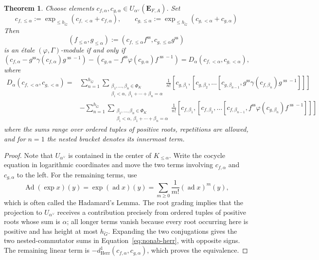 \documentclass[11pt]{amsart}
\newcommand{\MAJOREDIT}[1]{{\color{revisiongreen}#1}}
\newtheorem{thm}{Theorem}[section]
\theoremstyle{definition}
\newcommand{\bfE}{\mathbf{E}}
\renewcommand{\SS}{{\operatorname{ss}}}
\newcommand{\ad}{{\operatorname{ad}}}
\newcommand{\bG}{\breve{G}}
\newcommand{\Herr}{\mathrm{Herr}}
\begin{document}
\begin{thm}
\rm
Choose elements
$c_{f, \alpha}, c_{g, \alpha}\in U_{\alpha^\vee}(\bfE_{F, A})$.
Set
\[
c_{f,\le \alpha} := \exp_{\le h_{\bG}}(c_{f,<\alpha}+c_{f,\alpha})
,\qquad
c_{g,\le \alpha} := \exp_{\le h_{\bG}}(c_{g,<\alpha}+c_{g,\alpha})
\]
Then
\[
(f_{\le \alpha}, g_{\le \alpha})
:=(c_{f,\le \alpha}f^\SS, c_{g,\le\alpha}g^\SS)
\]
is an \'etale $(\varphi, \Gamma)$-module
if and only if
\[
(c_{f, \alpha} - g^\SS \gamma(c_{f, \alpha}) g^{\SS-1})
-
(c_{g, \alpha} - f^\SS \varphi(c_{g, \alpha}) f^{\SS-1})
=
D_\alpha(c_{f, <\alpha}, c_{g, <\alpha}),
\]
where
\begin{align}
\label{eq:nonab-herr}
D_\alpha(c_{f, <\alpha}, c_{g, <\alpha})
=& 
\sum_{n=1}^{h_{\bG}}
\sum_{\substack{\beta_1,\ldots,\beta_n\in\Phi_K\\
\beta_i<\alpha,\ \beta_1+\cdots+\beta_n=\alpha}}
\frac{1}{n!}[c_{g, \beta_1}, [c_{g, \beta_2},
\dots[c_{g, \beta_{n-1}}, g^\SS\gamma(c_{f,\beta_n})g^{\SS-1}]
]]
\\
&
- 
\sum_{n=1}^{h_{\bG}}
\sum_{\substack{\beta_1,\ldots,\beta_n\in\Phi_K\\
\beta_i<\alpha,\ \beta_1+\cdots+\beta_n=\alpha}}
\frac{1}{n!}[c_{f, \beta_1}, [c_{f, \beta_2},
\dots[c_{f, \beta_{n-1}}, f^\SS\varphi(c_{g,\beta_n})f^{\SS-1}]]]
\nonumber
\end{align}
where the sums range over ordered tuples of positive roots, repetitions are
allowed, and for $n=1$ the nested bracket denotes its innermost term.
\label{thm:coordinate}
\end{thm}

\begin{proof}
\MAJOREDIT{Note that $U_{\alpha^\vee}$ is contained in the center of
$K_{\le\alpha}$. Write the cocycle equation in logarithmic coordinates and
move the two terms involving $c_{f,\alpha}$ and $c_{g,\alpha}$ to the left.
For the remaining terms, use
\[
\operatorname{Ad}(\exp x)(y)=\exp(\ad x)(y)
=\sum_{m\ge0}\frac{1}{m!}(\ad x)^m(y),
\]
which is often called the Hadamard's Lemma.
The root grading implies that the projection to $U_{\alpha^\vee}$ receives a
contribution precisely from ordered tuples of positive roots whose sum is
$\alpha$; all longer terms vanish because every root occurring here is
positive and has height at most $h_{\bG}$. Expanding the two conjugations gives
the two nested-commutator sums in Equation~\ref{eq:nonab-herr}, with opposite
signs. The remaining linear term is
$-d^1_{\Herr}(c_{f,\alpha},c_{g,\alpha})$, which proves the equivalence.}
\end{proof}
\end{document}
